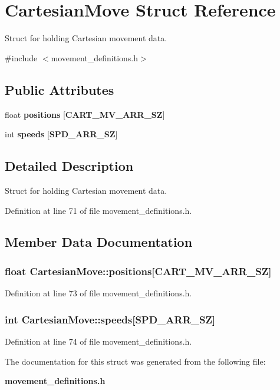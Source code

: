 \section{\-Cartesian\-Move \-Struct \-Reference}
\label{structCartesianMove}


\-Struct for holding \-Cartesian movement data.  




{\ttfamily \#include $<$movement\-\_\-definitions.\-h$>$}

\subsection*{\-Public \-Attributes}
\begin{DoxyCompactItemize}
\item 
float {\bf positions} [{\bf \-C\-A\-R\-T\-\_\-\-M\-V\-\_\-\-A\-R\-R\-\_\-\-S\-Z}]
\item 
int {\bf speeds} [{\bf \-S\-P\-D\-\_\-\-A\-R\-R\-\_\-\-S\-Z}]
\end{DoxyCompactItemize}


\subsection{\-Detailed \-Description}
\-Struct for holding \-Cartesian movement data. 

\-Definition at line 71 of file movement\-\_\-definitions.\-h.



\subsection{\-Member \-Data \-Documentation}
\subsubsection[{positions}]{\setlength{\rightskip}{0pt plus 5cm}float {\bf \-Cartesian\-Move\-::positions}[{\bf \-C\-A\-R\-T\-\_\-\-M\-V\-\_\-\-A\-R\-R\-\_\-\-S\-Z}]}\label{structCartesianMove_a5aca986f98b9c46901e768e3f6fa16d2}


\-Definition at line 73 of file movement\-\_\-definitions.\-h.

\subsubsection[{speeds}]{\setlength{\rightskip}{0pt plus 5cm}int {\bf \-Cartesian\-Move\-::speeds}[{\bf \-S\-P\-D\-\_\-\-A\-R\-R\-\_\-\-S\-Z}]}\label{structCartesianMove_af5e1acb2dc5b03d418a49c52f3c152a4}


\-Definition at line 74 of file movement\-\_\-definitions.\-h.



\-The documentation for this struct was generated from the following file\-:\begin{DoxyCompactItemize}
\item 
{\bf movement\-\_\-definitions.\-h}\end{DoxyCompactItemize}
